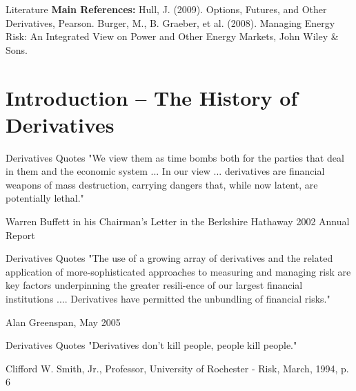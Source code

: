 
\begin{center}
\end{center}


Literature
	\textbf{Main References:}
	Hull, J. (2009). Options, Futures, and Other Derivatives, Pearson.
	Burger, M., B. Graeber, et al. (2008). Managing Energy Risk: An Integrated View on Power and Other Energy Markets, John Wiley \& Sons.


\section{Introduction -- The History of Derivatives}
	\begin{center}
	\end{center}


Derivatives Quotes
	"We view them as time bombs both for the parties that deal in them and the economic system ... In our view ... derivatives 
	are financial weapons of mass destruction, carrying dangers that, while now latent, are potentially lethal."
	\begin{flushright}
		\begin{footnotesize}
		Warren Buffett in his Chairman's Letter in the Berkshire Hathaway 2002 Annual Report
	 \end{footnotesize}
	\end{flushright}


Derivatives Quotes
	"The use of a growing array of derivatives and the related application of more-sophisticated approaches 
	to measuring and managing risk are key factors underpinning the greater resili-ence of our largest financial institutions .... 
	Derivatives have permitted the unbundling of financial risks."
	\begin{flushright}
		\begin{footnotesize}
		Alan Greenspan, May 2005
	 \end{footnotesize}
	\end{flushright}


Derivatives Quotes
	"Derivatives don't kill people, people kill people."
	\begin{flushright}
		\begin{footnotesize}
	 Clifford W. Smith, Jr., Professor, University of Rochester - Risk, March, 1994, p. 6
	 \end{footnotesize}
	\end{flushright}


